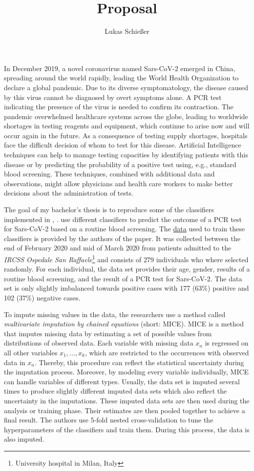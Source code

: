 \documentclass[12pt,a4paper,oneside]{article}
\title{Proposal}
\author{Lukas Schießer}
\date{}
\begin{document}
\maketitle
In December 2019, a novel coronavirus named Sars-CoV-2 emerged in China, spreading around the world rapidly, leading the World Health Organization to declare a global pandemic. Due to its diverse symptomatology, the disease caused by this virus cannot be diagnosed by overt symptoms alone. A PCR test indicating the presence of the virus is needed to confirm its contraction.
The pandemic overwhelmed healthcare systems across the globe, leading to worldwide shortages in testing reagents and equipment, which continue to arise now and will occur again in the future. \cite{jaecklin_2020, asm.org_2020}
As a consequence of testing supply shortages, hospitals face the difficult decision of whom to test for this disease.
Artificial Intelligence techniques can help to manage testing capacities by identifying patients with this disease or by predicting the probability of a positive test using, e.g., standard blood screening. These techniques, combined with additional data and observations, might allow physicians and health care workers to make better decisions about the administration of tests.
\par
The goal of my bachelor's thesis is to reproduce some of the classifiers implemented in \citeauthor{RN127}, \citeyear{RN127} \cite{RN127}. \citeauthor{RN127} use different classifiers to predict the outcome of a PCR test for Sars-CoV-2 based on a routine blood screening. The \href{https://zenodo.org/record/3886927/files/covid_study_v2.xlsx?download=1}{data} used to train these classifiers is provided by the authors of the paper. It was collected between the end of February 2020 and mid of March 2020 from patients admitted to the \textit{IRCSS Ospedale San Raffaele}\footnote{University hospital in Milan, Italy} and consists of 279 individuals who where selected randomly. For each individual, the data set provides their age, gender, results of a routine blood screening, and the result of a PCR test for Sars-CoV-2. The data set is only slightly imbalanced towards positive cases with 177 (63\%) positive and 102 (37\%) negative cases.
\par
To impute missing values in the data, the researchers use a method called \textit{multivariate imputation by chained equations} (short: MICE). MICE is a method that imputes missing data by estimating a set of possible values from distributions of observed data. Each variable with missing data $x_n$ is regressed on all other variables $x_1, ..., x_k$, which are restricted to the occurrences with observed data in $x_n$. Thereby, this procedure can reflect the statistical uncertainty during the imputation process. Moreover, by modeling every variable individually, MICE can handle variables of different types. Usually, the data set is imputed several times to produce slightly different imputed data sets which also reflect the uncertainty in the imputations. These imputed data sets are then used during the analysis or training phase. Their estimates are then pooled together to achieve a final result. \cite{RN141,RN142, RN144} The authors use 5-fold nested cross-validation to tune the hyperparameters of the classifiers and train them. During this process, the data is also imputed.
\end{document}
